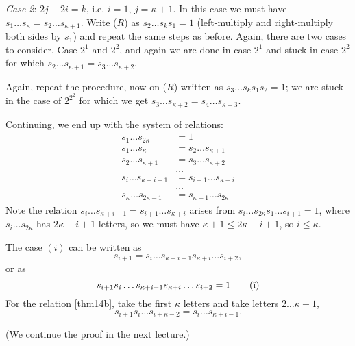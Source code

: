 {\em Case 2}: $2j-2i=k$, i.e. $i=1$, $j=\kappa+1$. In this case we must have
$s_1 \dots s_\kappa = s_2 \dots s_{\kappa+1}$. Write ($R$) as
$s_2 \dots s_k s_1 = 1$ (left-multiply and right-multiply both sides by $s_1$)
and repeat the same steps as before. Again, there are two cases to consider,
Case $2^1$ and $2^2$, and again we are done in case $2^1$ and stuck in case
$2^2$ for which $s_2 \dots s_{\kappa+1} = s_3 \dots s_{\kappa+2}$.

Again, repeat the procedure, now on ($R$) written as $s_3 \dots s_k s_1 s_2 = 1$;
we are stuck in the case of $2^{2^2}$ for which we get $s_3 \dots s_{\kappa+2}
= s_4 \dots s_{\kappa+3}$.

Continuing, we end up with the system of relations:
\begin{align*}
    s_1 \dots s_{2 \kappa} &= 1 \tag{$R$} \\
    s_1 \dots s_{\kappa} &= s_2 \dots s_{\kappa+1} \\
    s_2 \dots s_{\kappa+1} &= s_3 \dots s_{\kappa+2} \\
    & \dots \\
    s_i \dots s_{\kappa+i-1} &= s_{i+1} \dots s_{\kappa+i} \\
    & \dots \\
    s_\kappa \dots s_{2\kappa-1} &= s_{\kappa+1} \dots s_{2\kappa}
\end{align*}
Note the relation $s_i \dots s_{\kappa+i-1} = s_{i+1} \dots s_{\kappa+i}$ arises
from $s_i \dots s_{2\kappa} s_1 \dots s_{i+1} = 1$,
where $s_i \dots s_{2\kappa}$ has $2\kappa-i+1$ letters, so
we must have $\kappa+1 \leq 2\kappa-i+1$, so $i \leq \kappa$.

The case $(i)$ can be written as
\[
    s_{i+1} = s_i \dots s_{\kappa+i-1} s_{\kappa+i} \dots s_{i+2},
\]
or as
\begin{equation} \label{thm14b}
    s_{i+1} s_i \dots s_{\kappa+i-1} s_{\kappa+i} \dots s_{i+2} = 1
    \tag{\^{i}}
\end{equation}
For the relation \eqref{thm14b}, take the first $\kappa$ letters and take letters
$2 \dots \kappa+1$,
\[
    s_{i+1} s_i \dots s_{i+\kappa-2} = s_i \dots s_{\kappa+i-1}.
\]

(We continue the proof in the next lecture.)

